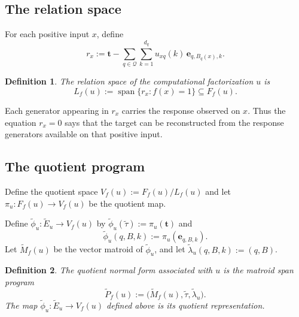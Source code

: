 \documentclass[11pt]{article}
\numberwithin{equation}{section}
\newtheorem{definition}{Definition}[section]
\theoremstyle{remark}
\begin{document}
\subsection{The relation space}
\label{subsec:normal-form-relation-space}

For each positive input $x$, define
\begin{equation}
    r_x
    :=
    \mathbf t
    -
    \sum_{q\in\mathcal Q}
    \sum_{k=1}^{d_q}
        u_{xq}(k)\,
        \mathbf e_{q,B_q(x),k}.
\end{equation}

\begin{definition}
\label{def:normal-form-relation-space}
The \emph{relation space} of the computational factorization $u$ is
\begin{equation}
    L_f(u)
    :=
    \operatorname{span}
    \{
        r_x:
        f(x)=1
    \}
    \subseteq F_f(u).
\end{equation}
\end{definition}

Each generator appearing in $r_x$ carries the response observed on $x$.
Thus the equation $r_x=0$ says that the target can be reconstructed from
the response generators available on that positive input.


\subsection{The quotient program}
\label{subsec:quotient-normal-form}

Define the quotient space
$V_f(u):=F_f(u)/L_f(u)$ and let
$\pi_u:F_f(u)\to V_f(u)$ be the quotient map.

Define
$\widetilde\phi_u:\widetilde E_u\to V_f(u)$ by
$\widetilde\phi_u(\widetilde\tau):=\pi_u(\mathbf t)$ and
\begin{equation}
    \widetilde\phi_u(q,B,k)
    :=
    \pi_u(\mathbf e_{q,B,k}).
\end{equation}
Let $\widetilde M_f(u)$ be the vector matroid of
$\widetilde\phi_u$, and let $\widetilde\lambda_u(q,B,k):=(q,B)$.

\begin{definition}
\label{def:quotient-normal-form}
The \emph{quotient normal form associated with $u$} is the matroid span
program
\begin{equation}
    \widetilde P_f(u)
    :=
    \bigl(
        \widetilde M_f(u),
        \widetilde\tau,
        \widetilde\lambda_u
    \bigr).
\end{equation}
The map $\widetilde\phi_u:\widetilde E_u\to V_f(u)$ defined above is
its \emph{quotient representation}.
\end{definition}
\end{document}
